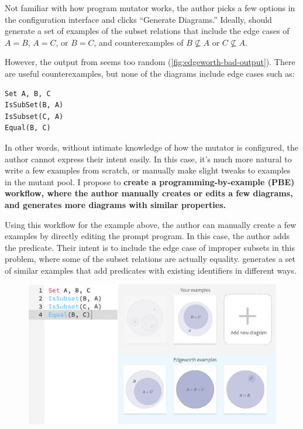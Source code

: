 Not familiar with how program mutator works, the author picks a few options in the configuration interface and clicks ``Generate Diagrams.'' Ideally, \Edgeworth should generate a set of examples of the subset relations that include the edge cases of $A = B$, $A = C$, or $B = C$, and counterexamples of $B \not\subseteq A$ or $C \not\subseteq A$. 

However, the output from \Edgeworth seems too random (\cref{fig:edgeworth-bad-output}). There are useful counterexamples, but none of the diagrams include edge cases such as:
\begin{verbatim}
Set A, B, C
IsSubSet(B, A)
IsSubset(C, A)
Equal(B, C)
\end{verbatim}

In other words, without intimate knowledge of how the \Edgeworth mutator is configured, the author cannot express their intent easily. In this case, it's much more natural to write a few examples from scratch, or manually make slight tweaks to examples in the mutant pool. I propose to \textbf{create a programming-by-example (PBE) workflow, where the author manually creates or edits a few diagrams, and \Edgeworth generates more diagrams with similar properties.}

Using this workflow for the example above, the author can manually create a few examples by directly editing the prompt program. In this case, the author adds the  predicate. Their intent is to include the edge case of improper subsets in this problem, where some of the subset relations are actually equality. \Edgeworth generates a set of similar examples that add  predicates with existing identifiers in different ways. 

\vspace{10pt}
\begin{figure}[h]
    \centering
    \includegraphics[width=0.8\linewidth]{assets/appendix/synthesis-driven-workflow.pdf}
\end{figure}
\vspace{10pt}

